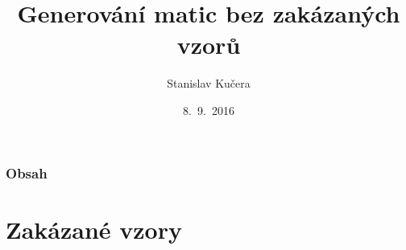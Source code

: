 \documentclass{beamer}
\title{Generování matic bez zakázaných vzorů}
\author{Stanislav Kučera}
\institute[IÚUK]{Informatický ústav Univerzity Karlovy}
\date{8.~9.~2016}
\begin{document}
\begin{frame}
\titlepage
\end{frame}

\begin{frame}
\frametitle{Obsah}
\tableofcontents
\end{frame}

\section{Zakázané vzory}
\end{document}
